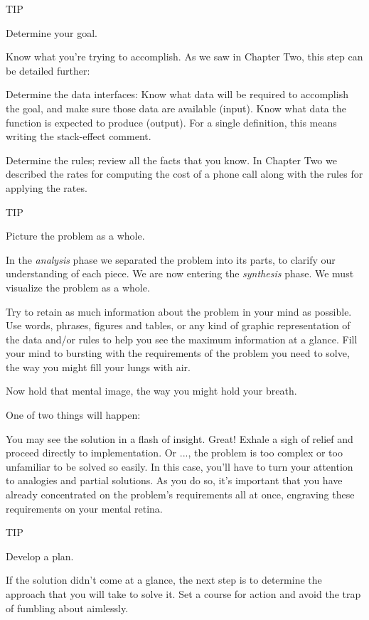 TIP

Determine your goal.

Know what you're trying to accomplish. As we saw in Chapter Two, this
step can be detailed further:

Determine the data interfaces: Know what data will be required to
accomplish the goal, and make sure those data are available (input).
Know what data the function is expected to produce (output). For a single
definition, this means writing the stack-effect comment.

Determine the rules; review all the facts that you know. In Chapter
Two we described the rates for computing the cost of a phone call along
with the rules for applying the rates.

TIP

Picture the problem as a whole.

In the \emph{analysis} phase we separated the problem into its parts, to
clarify our understanding of each piece. We are now entering the
\emph{synthesis} phase. We must visualize the problem as a whole.

Try to retain as much information about the problem in your mind
as possible. Use words, phrases, figures and tables, or any kind of graphic
representation of the data and/or rules to help you see the maximum
information at a glance. Fill your mind to bursting with the requirements
of the problem you need to solve, the way you might fill your lungs with
air.

Now hold that mental image, the way you might hold your breath.

One of two things will happen:

You may see the solution in a flash of insight. Great! Exhale a sigh
of relief and proceed directly to implementation. Or ..., the problem is
too complex or too unfamiliar to be solved so easily. In this case, you'll
have to turn your attention to analogies and partial solutions. As you do
so, it's important that you have already concentrated on the problem's
requirements all at once, engraving these requirements on your mental
retina.

TIP

Develop a plan.

If the solution didn't come at a glance, the next step is to determine the
approach that you will take to solve it. Set a course for action and avoid
the trap of fumbling about aimlessly.

